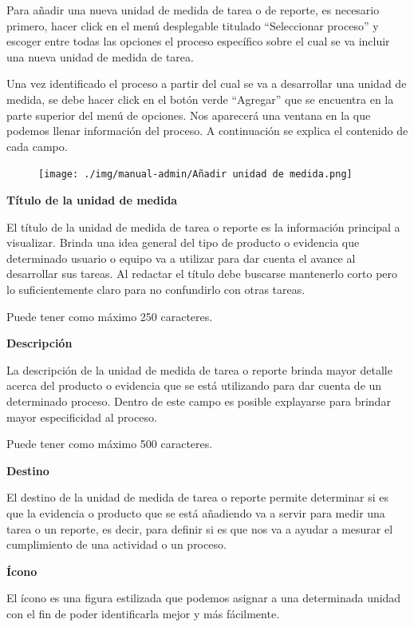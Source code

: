 \documentclass[
  letterpaper,
  DIV=11,
  numbers=noendperiod]{scrreprt}
\begin{document}
Para añadir una nueva unidad de medida de tarea o de reporte, es
necesario primero, hacer click en el menú desplegable titulado
``Seleccionar proceso'' y escoger entre todas las opciones el proceso
específico sobre el cual se va incluir una nueva unidad de medida de
tarea.

Una vez identificado el proceso a partir del cual se va a desarrollar
una unidad de medida, se debe hacer click en el botón verde ``Agregar''
que se encuentra en la parte superior del menú de opciones. Nos
aparecerá una ventana en la que podemos llenar información del proceso.
A continuación se explica el contenido de cada campo.

\begin{figure}

{\centering \texttt{[image: ./img/manual-admin/Añadir unidad de medida.png]}

}

\end{figure}

\textbf{Título de la unidad de medida}

El título de la unidad de medida de tarea o reporte es la información
principal a visualizar. Brinda una idea general del tipo de producto o
evidencia que determinado usuario o equipo va a utilizar para dar cuenta
el avance al desarrollar sus tareas. Al redactar el título debe buscarse
mantenerlo corto pero lo suficientemente claro para no confundirlo con
otras tareas.

Puede tener como máximo 250 caracteres.

\textbf{Descripción}

La descripción de la unidad de medida de tarea o reporte brinda mayor
detalle acerca del producto o evidencia que se está utilizando para dar
cuenta de un determinado proceso. Dentro de este campo es posible
explayarse para brindar mayor especificidad al proceso.

Puede tener como máximo 500 caracteres.

\textbf{Destino}

El destino de la unidad de medida de tarea o reporte permite determinar
si es que la evidencia o producto que se está añadiendo va a servir para
medir una tarea o un reporte, es decir, para definir si es que nos va a
ayudar a mesurar el cumplimiento de una actividad o un proceso.

\textbf{Ícono}

El ícono es una figura estilizada que podemos asignar a una determinada
unidad con el fin de poder identificarla mejor y más fácilmente.
\end{document}
